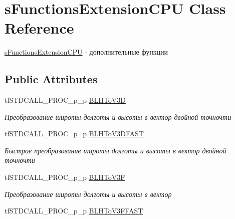 \hypertarget{structs_functions_extension_c_p_u}{\section{s\-Functions\-Extension\-C\-P\-U Class Reference}
\label{structs_functions_extension_c_p_u}
}


\hyperlink{structs_functions_extension_c_p_u}{s\-Functions\-Extension\-C\-P\-U} -\/ дополнительные функции  


\subsection*{Public Attributes}
\begin{DoxyCompactItemize}
\item 
\hypertarget{structs_functions_extension_c_p_u_a40a90553c63d7c3ae4016b7d10e9e2ba}{tf\-S\-T\-D\-C\-A\-L\-L\-\_\-\-P\-R\-O\-C\-\_\-p\-\_\-p \hyperlink{structs_functions_extension_c_p_u_a40a90553c63d7c3ae4016b7d10e9e2ba}{B\-L\-H\-To\-V3\-D}}\label{structs_functions_extension_c_p_u_a40a90553c63d7c3ae4016b7d10e9e2ba}

\begin{DoxyCompactList}\small\item\em Преобразование широты долготы и высоты в вектор двойной точночти \end{DoxyCompactList}\item 
\hypertarget{structs_functions_extension_c_p_u_a73cb1c147531036cec75cb7d636bbfe2}{tf\-S\-T\-D\-C\-A\-L\-L\-\_\-\-P\-R\-O\-C\-\_\-p\-\_\-p \hyperlink{structs_functions_extension_c_p_u_a73cb1c147531036cec75cb7d636bbfe2}{B\-L\-H\-To\-V3\-D\-F\-A\-S\-T}}\label{structs_functions_extension_c_p_u_a73cb1c147531036cec75cb7d636bbfe2}

\begin{DoxyCompactList}\small\item\em Быстрое преобразование широты долготы и высоты в вектор двойной точночти \end{DoxyCompactList}\item 
\hypertarget{structs_functions_extension_c_p_u_a8b3716404c1421fd98c9fd6de2579479}{tf\-S\-T\-D\-C\-A\-L\-L\-\_\-\-P\-R\-O\-C\-\_\-p\-\_\-p \hyperlink{structs_functions_extension_c_p_u_a8b3716404c1421fd98c9fd6de2579479}{B\-L\-H\-To\-V3\-F}}\label{structs_functions_extension_c_p_u_a8b3716404c1421fd98c9fd6de2579479}

\begin{DoxyCompactList}\small\item\em Преобразование широты долготы и высоты в вектор \end{DoxyCompactList}\item 
\hypertarget{structs_functions_extension_c_p_u_a61f63602a0b3b7c5f27d2e822de49673}{tf\-S\-T\-D\-C\-A\-L\-L\-\_\-\-P\-R\-O\-C\-\_\-p\-\_\-p \hyperlink{structs_functions_extension_c_p_u_a61f63602a0b3b7c5f27d2e822de49673}{B\-L\-H\-To\-V3\-F\-F\-A\-S\-T}}\label{structs_functions_extension_c_p_u_a61f63602a0b3b7c5f27d2e822de49673}


\end{DoxyCompactItemize}
